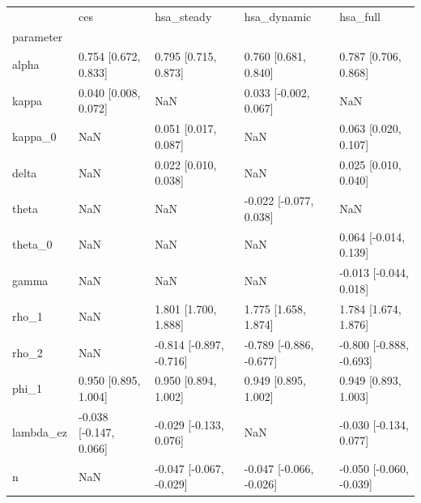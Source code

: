 \begin{tabular}{lllll}
\toprule
 & ces & hsa\_steady & hsa\_dynamic & hsa\_full \\
parameter &  &  &  &  \\
\midrule
alpha & 0.754 [0.672, 0.833] & 0.795 [0.715, 0.873] & 0.760 [0.681, 0.840] & 0.787 [0.706, 0.868] \\
kappa & 0.040 [0.008, 0.072] & NaN & 0.033 [-0.002, 0.067] & NaN \\
kappa\_0 & NaN & 0.051 [0.017, 0.087] & NaN & 0.063 [0.020, 0.107] \\
delta & NaN & 0.022 [0.010, 0.038] & NaN & 0.025 [0.010, 0.040] \\
theta & NaN & NaN & -0.022 [-0.077, 0.038] & NaN \\
theta\_0 & NaN & NaN & NaN & 0.064 [-0.014, 0.139] \\
gamma & NaN & NaN & NaN & -0.013 [-0.044, 0.018] \\
rho\_1 & NaN & 1.801 [1.700, 1.888] & 1.775 [1.658, 1.874] & 1.784 [1.674, 1.876] \\
rho\_2 & NaN & -0.814 [-0.897, -0.716] & -0.789 [-0.886, -0.677] & -0.800 [-0.888, -0.693] \\
phi\_1 & 0.950 [0.895, 1.004] & 0.950 [0.894, 1.002] & 0.949 [0.895, 1.002] & 0.949 [0.893, 1.003] \\
lambda\_ez & -0.038 [-0.147, 0.066] & -0.029 [-0.133, 0.076] & NaN & -0.030 [-0.134, 0.077] \\
n & NaN & -0.047 [-0.067, -0.029] & -0.047 [-0.066, -0.026] & -0.050 [-0.060, -0.039] \\
\bottomrule
\end{tabular}
